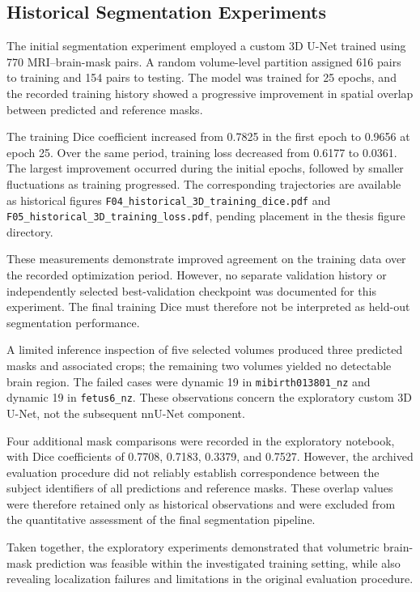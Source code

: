 \subsection{Historical Segmentation Experiments}
\label{subsec:historical_3d_segmentation}

The initial segmentation experiment employed a custom 3D U-Net trained using 770 MRI--brain-mask pairs. A random volume-level partition assigned 616 pairs to training and 154 pairs to testing. The model was trained for 25 epochs, and the recorded training history showed a progressive improvement in spatial overlap between predicted and reference masks.

The training Dice coefficient increased from 0.7825 in the first epoch to 0.9656 at epoch 25. Over the same period, training loss decreased from 0.6177 to 0.0361. The largest improvement occurred during the initial epochs, followed by smaller fluctuations as training progressed. The corresponding trajectories are available as historical figures \texttt{F04\_historical\_3D\_training\_dice.pdf} and \texttt{F05\_historical\_3D\_training\_loss.pdf}, pending placement in the thesis figure directory.

These measurements demonstrate improved agreement on the training data over the recorded optimization period. However, no separate validation history or independently selected best-validation checkpoint was documented for this experiment. The final training Dice must therefore not be interpreted as held-out segmentation performance.

A limited inference inspection of five selected volumes produced three predicted masks and associated crops; the remaining two volumes yielded no detectable brain region. The failed cases were dynamic 19 in \texttt{mibirth013801\_nz} and dynamic 19 in \texttt{fetus6\_nz}. These observations concern the exploratory custom 3D U-Net, not the subsequent nnU-Net component.

Four additional mask comparisons were recorded in the exploratory notebook, with Dice coefficients of 0.7708, 0.7183, 0.3379, and 0.7527. However, the archived evaluation procedure did not reliably establish correspondence between the subject identifiers of all predictions and reference masks. These overlap values were therefore retained only as historical observations and were excluded from the quantitative assessment of the final segmentation pipeline.

Taken together, the exploratory experiments demonstrated that volumetric brain-mask prediction was feasible within the investigated training setting, while also revealing localization failures and limitations in the original evaluation procedure.

